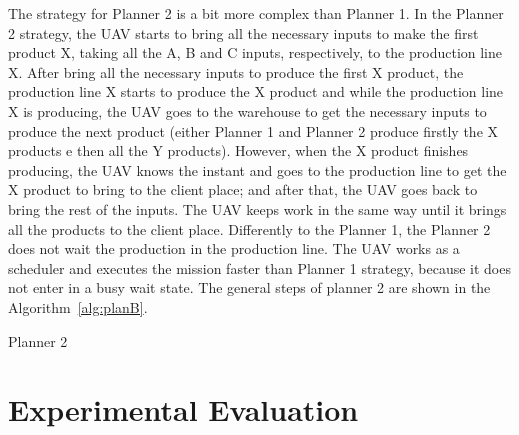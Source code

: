 \documentclass[conference]{IEEEtran}
\begin{document}
The strategy for Planner 2 is a bit more complex than Planner 1. In the Planner 2 strategy, the UAV starts to bring all the necessary inputs to make the first product X, taking all the A, B and C inputs, respectively, to the production line X. After bring all the necessary inputs to produce the first X product, the production line X starts to produce the X product and while the production line X is producing, the UAV goes to the warehouse to get the necessary inputs to produce the next product (either Planner 1 and Planner 2 produce firstly the X products e then all the Y products). However, when the X product finishes producing, the UAV knows the instant and goes to the production line to get the X product to bring to the client place; and after that, the UAV goes back to bring the rest of the inputs. The UAV keeps work in the same way until it brings all the products to the client place. Differently to the Planner 1, the Planner 2 does not wait the production in the production line. The UAV works as a scheduler and executes the mission faster than Planner 1 strategy, because it does not enter in a busy wait state. The general steps of planner 2 are shown in the Algorithm~\ref{alg:planB}.
%
\begin{algorithm}[ht]
\scriptsize
{}
\captionsetup{list=no}
\caption{Planner 2}\label{alg:planB}
\end{algorithm}


\section{Experimental Evaluation}
\label{sec:results}
\end{document}
